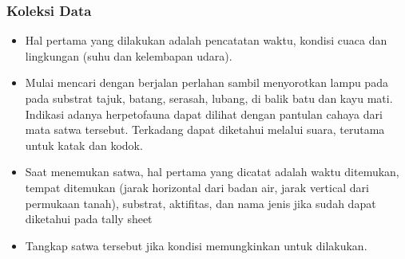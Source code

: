 \documentclass[
]{book}
\providecommand{\tightlist}{%
  \setlength{\itemsep}{0pt}\setlength{\parskip}{0pt}}
\begin{document}
\hypertarget{koleksi-data}{%
\subsubsection*{Koleksi Data}\label{koleksi-data}}

\begin{itemize}
\tightlist
\item
  Hal pertama yang dilakukan adalah pencatatan waktu, kondisi cuaca dan lingkungan (suhu dan kelembapan udara).
\item
  Mulai mencari dengan berjalan perlahan sambil menyorotkan lampu pada pada substrat tajuk, batang, serasah, lubang, di balik batu dan kayu mati. Indikasi adanya herpetofauna dapat dilihat dengan pantulan cahaya dari mata satwa tersebut. Terkadang dapat diketahui melalui suara, terutama untuk katak dan kodok.
\item
  Saat menemukan satwa, hal pertama yang dicatat adalah waktu ditemukan, tempat ditemukan (jarak horizontal dari badan air, jarak vertical dari permukaan tanah), substrat, aktifitas, dan nama jenis jika sudah dapat diketahui pada tally sheet
\item
  Tangkap satwa tersebut jika kondisi memungkinkan untuk dilakukan.


\end{itemize}
\end{document}
